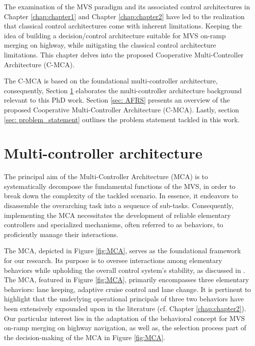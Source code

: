 
The examination of the MVS paradigm and its associated control architectures in Chapter \ref{chap:chapter1} and Chapter \ref{chap:chapter2} have led to the realization that classical control architectures come with inherent limitations. Keeping the idea of building a decision/control architecture suitable for MVS on-ramp merging on highway, while mitigating the classical control architecture limitations. This chapter delves into the proposed Cooperative Multi-Controller Architecture (C-MCA). 




The C-MCA is based on the foundational multi-controller architecture, consequently, Section \ref{sec:MCA} elaborates the multi-controller architecture background relevant to this PhD work. Section \ref{sec: AFRS} presents an overview of the proposed Cooperative Multi-Controller Architecture (C-MCA).  Lastly, section \ref{sec: problem_statement} outlines the problem statement tackled in this work. 





\section{Multi-controller architecture} \label{sec:MCA}



The principal aim of the Multi-Controller Architecture (MCA) is to systematically decompose the fundamental functions of the MVS, in order to break down the complexity of the tackled scenario. In essence, it endeavors to disassemble the overarching task into a sequence of sub-tasks. Consequently, implementing the MCA necessitates the development of reliable elementary controllers and specialized mechanisms, often referred to as behaviors, to proficiently manage their interactions. 

The MCA, depicted in Figure \ref{fig:MCA}, serves as the foundational framework for our research. Its purpose is to oversee interactions among elementary behaviors while upholding the overall control system's stability, as discussed in \cite{dimiathesis}. The MCA, featured in Figure \ref{fig:MCA}, primarily encompasses three elementary behaviors: lane keeping, adaptive cruise control and lane change. It is pertinent to highlight that the underlying operational principals of three two behaviors have been extensively expounded upon in the literature (cf. Chapter \ref{chap:chapter2}). Our particular interest lies in the adaptation of the behavioral concept for MVS on-ramp merging on highway navigation, as well as, the selection process part of the decision-making of the MCA in Figure \ref{fig:MCA}. 

